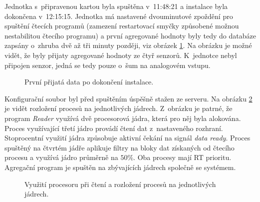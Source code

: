 Jednotka s~připravenou kartou byla spuštěna v~11:48:21 a instalace byla dokončena v~12:15:15. Jednotka má nastavené dvouminutové zpoždění pro spuštění čtecích programů (zamezení restartovací smyčky způsobené možnou nestabilitou čtecího programu) a první agregované hodnoty byly tedy do databáze zapsány o~zhruba dvě až tři minuty později, viz obrázek \ref{pic:installsdf}. Na obrázku je možné vidět, že byly přijaty agregované hodnoty ze čtyř senzorů. K~jednotce nebyl připojen senzor, jedná se tedy pouze o~šum na analogovém vstupu.
\begin{figure}
  \centering
  \caption{První přijatá data po dokončení instalace.}\label{pic:installsdf}
\end{figure}
Konfigurační soubor byl před spuštěním úspěšně stažen ze serveru. Na obrázku \ref{pic:htop} je vidět rozložení procesů na jednotlivých jádrech. Z~obrázku je patrné, že program \textit{Reader} využívá dvě procesorová jádra, která pro něj byla alokována. Proces využívající třetí jádro provádí čtení dat z~nastaveného rozhraní. Stoprocentní využití jádra způsobuje aktivní čekání na signál \textit{data ready}. Proces spuštěný na čtvrtém jádře aplikuje filtry na bloky dat získaných od čtecího procesu a využívá jádro průměrně na $50 \%$. Oba procesy mají RT prioritu. Agregační program je spuštěn na zbývajících jádrech společně se systémem.
\begin{figure}
  \centering
  \caption{Využití procesoru při čtení a rozložení procesů na jednotlivých jádrech.}\label{pic:htop}
\end{figure}
